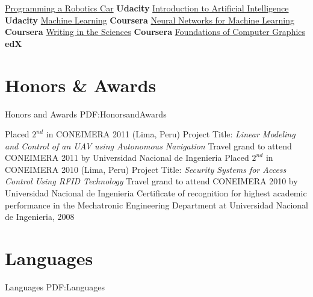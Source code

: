 \documentclass[letterpaper,MMMyyyy,nonstop]{simpleresumecv}
\begin{document}
\begin{body}
\GapNoBreak
\BulletItem
\href{https://github.com/davidlavy88/resume/blob/master/Certificates/robotic-car-certificate.pdf}
{Programming a Robotics Car}
\hfill
\textbf{Udacity}
\GapNoBreak
\BulletItem
\href{https://github.com/davidlavy88/resume/blob/master/Certificates/artificial-intelligence-certificate.pdf}
{Introduction to Artificial Intelligence}
\hfill
\textbf{Udacity}
\GapNoBreak
\BulletItem
\href{https://github.com/davidlavy88/resume/blob/master/Certificates/machine-learning-certificate.pdf}
{Machine Learning}
\hfill
\textbf{Coursera}
\GapNoBreak
\BulletItem
\href{https://github.com/davidlavy88/resume/blob/master/Certificates/nn-for-ml-certificate.pdf}
{Neural Networks for Machine Learning}
\hfill
\textbf{Coursera}
\GapNoBreak
\BulletItem
\href{https://github.com/davidlavy88/resume/blob/master/Certificates/writing-in-sciences-certificate.pdf}
{Writing in the Sciences}
\hfill
\textbf{Coursera}
\GapNoBreak
\BulletItem
\href{https://github.com/davidlavy88/resume/blob/master/Certificates/cs184-certificate.pdf}
{Foundations of Computer Graphics}
\hfill
\textbf{edX}


\section
{Honors \newline
\& Awards}
{Honors and Awards}
{PDF:HonorsandAwards}

\GapNoBreak
\BulletItem
Placed $2^{nd}$ in CONEIMERA 2011 (Lima, Peru)
\SubBulletItem
Project Title: \textit{Linear Modeling and Control of an UAV using Autonomous Navigation}
\GapNoBreak
\BulletItem
Travel grand to attend CONEIMERA 2011 by Universidad Nacional de Ingenieria
\GapNoBreak
\BulletItem
Placed $2^{nd}$ in CONEIMERA 2010 (Lima, Peru)
\SubBulletItem
Project Title: \textit{Security Systems for Access Control Using RFID Technology}
\GapNoBreak
\BulletItem
Travel grand to attend CONEIMERA 2010 by Universidad Nacional de Ingenieria
\GapNoBreak
\BulletItem
Certificate of recognition for highest academic performance in the Mechatronic Engineering Department at Universidad Nacional de Ingenieria, 2008


\section
{Languages}
{Languages}
{PDF:Languages}


\end{body}
\end{document}
